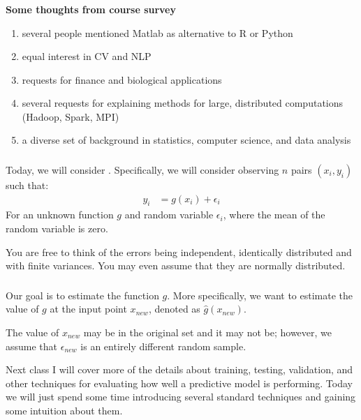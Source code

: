 \documentclass[xetex,mathserif,serif,aspectratio=169]{beamer}
\begin{document}
\begin{frame}[fragile] \frametitle{} \oldB \small

\textbf{Some thoughts from course survey}

\begin{enumerate}
\item several people mentioned Matlab as alternative
  to R or Python
\item equal interest in CV and NLP
\item requests for finance and biological applications
\item several requests for explaining methods for large,
  distributed computations (Hadoop, Spark, MPI)
\item a diverse set of background in statistics, computer science,
  and data analysis
\end{enumerate}

\end{frame}

\begin{frame}[fragile] \frametitle{} \oldB \small

Today, we will consider .
Specifically, we will consider observing $n$ pairs $(x_i,y_i)$ such
that:
\begin{align*}
y_i &= g(x_i) + \epsilon_i
\end{align*}
For an unknown function $g$ and random variable $\epsilon_i$, where the mean
of the random variable is zero.

\pause You are free to think of the errors being independent, identically
distributed and with finite variances. You may even assume that they are
normally distributed.

\end{frame}

\begin{frame}[fragile] \frametitle{} \oldB \small

Our goal is to estimate the function $g$. More specifically,
we want to estimate the value of $g$ at the input point $x_{new}$,
denoted as $\widehat{g}(x_{new})$.

\pause The value of $x_{new}$ may be in the original set and it may
not be; however, we assume that $\epsilon_{new}$ is an
entirely different random sample.

\pause Next class I will cover more of the details about training, testing,
validation, and other techniques for evaluating how well a predictive
model is performing. Today we will just spend some time introducing
several standard techniques and gaining some intuition about them.

\end{frame}
\end{document}
